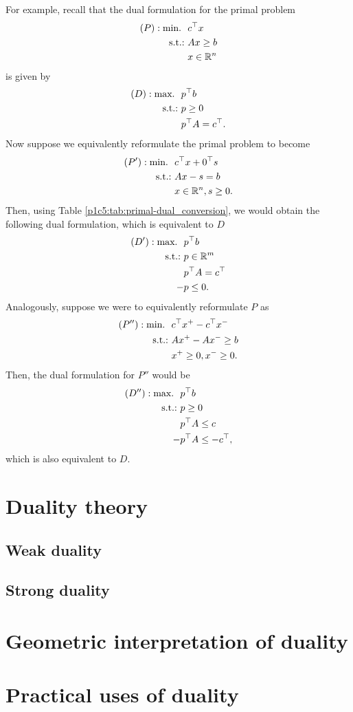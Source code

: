 For example, recall that the dual formulation for the primal problem 
%
\begin{align*}
	(P) : \mathop{\text{min.~}} \ & c^\top x \\
	\mathop{\text{s.t.:~}} &Ax \geq b \\
	&x \in \mathbb{R}^n
\end{align*}
%
is given by
%
\begin{align*}
	(D) : \mathop{\text{max.~}} \ & p^\top b \\
	\mathop{\text{s.t.:~}} &p \geq 0 \\
	&p^\top A = c^\top. 
\end{align*}
%
Now suppose we equivalently reformulate the primal problem to become
\begin{align*}
	(P') : \mathop{\text{min.~}} \ & c^\top x + 0^\top s \\
	\mathop{\text{s.t.:~}} &A x - s = b \\
	&x \in \mathbb{R}^n, s \geq 0.
\end{align*}
%
Then, using Table \ref{p1c5:tab:primal-dual_conversion}, we would obtain the following dual formulation, which is equivalent to $D$
\begin{align*}
	(D') : \mathop{\text{max.~}} \ & p^\top b \\
	\mathop{\text{s.t.:~}} &p \in \mathbb{R}^m \\
	&p^\top A = c^\top \\
	-&p \leq 0.
\end{align*}
%
Analogously, suppose we were to equivalently reformulate $P$ as 
%
\begin{align*}
	(P'') : \mathop{\text{min.~}} \ & c^\top x^+ - c^\top x^- \\
	\mathop{\text{s.t.:~}} &Ax^+ - Ax^- \geq b \\
	&x^+ \geq 0, x^- \geq 0.
\end{align*}
%
Then, the dual formulation for $P''$ would be 
%
\begin{align*}
	(D'') : \mathop{\text{max.~}} \ & p^\top b \\
	\mathop{\text{s.t.:~}} &p \geq 0 \\
	&p^\top A \leq c \\
	-&p^\top A \leq -c^\top,
\end{align*}
%
which is also equivalent to $D$.



    

\section{Duality theory}

\subsection{Weak duality}

\subsection{Strong duality}

\section{Geometric interpretation of duality}

\section{Practical uses of duality}

